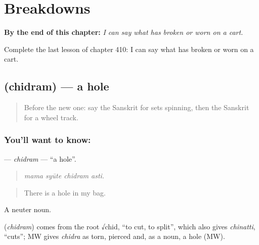 
\chapter{Breakdowns}
\label{ch:sa-breakdowns}

\begin{chapteropening}
\textbf{By the end of this chapter:} \emph{I can say what has broken or worn on a cart.}

Complete the last lesson of chapter 410: I can say what has broken or worn on a cart.
\end{chapteropening}

\section[\texorpdfstring{\sk{छिद्रम्} (chidram)}{छिद्रम् (chidram)}]{ (chidram) — a hole}

\label{lesson:SA-C410-chidram}



\begin{quote}
Before the new one: say the Sanskrit for sets spinning, then the Sanskrit for a wheel track.
\end{quote}

\subsection*{You'll want to know: }
\textbf{} — \emph{chidram} — \textquotedblleft{}a hole\textquotedblright{}.

\begin{quote}
   
\end{quote}

\begin{quote}
\emph{mama syūte chidram asti.}
\end{quote}

\begin{quote}
There is a hole in my bag.
\end{quote}

A neuter noun.

\begin{cousinweb}
\textbf{} (\emph{chidram}) comes from the root √chid, \textquotedblleft{}to cut, to split\textquotedblright{}, which also gives \emph{chinatti}, \textquotedblleft{}cuts\textquotedblright{}; MW gives \emph{chidra} as torn, pierced and, as a noun, a hole (MW).
\end{cousinweb}

